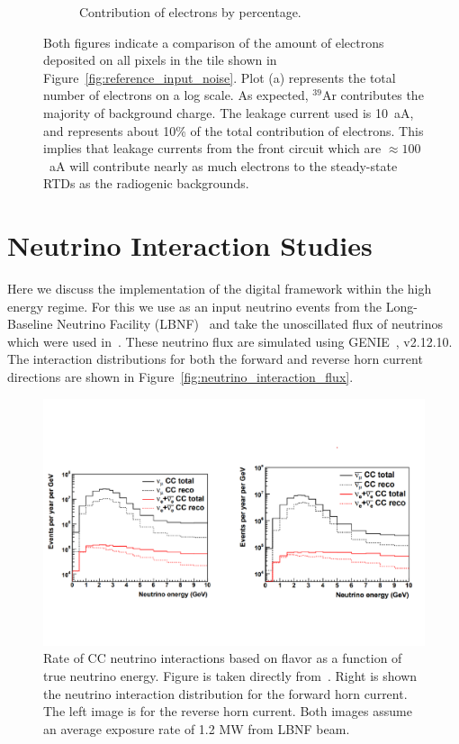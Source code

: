 \begin{figure}
\begin{subfigure}{.5\textwidth}
  \caption{Contribution of electrons by percentage.}
\end{subfigure}
\caption{Both figures indicate a comparison of the amount of electrons deposited on all pixels in the tile shown in Figure~\ref{fig:reference_input_noise}.
Plot (a) represents the total number of electrons on a log scale.
As expected, $^{39}$Ar contributes the majority of background charge.
The leakage current used is 10~\unit{aA}, and represents about 10\% of the total contribution of electrons.
This implies that leakage currents from the front circuit which are $\approx 100$~\unit{aA} will contribute nearly as much electrons to the steady-state RTDs as the radiogenic backgrounds.
}
\label{fig:compare_electron_contribution}
\end{figure}

\section{Neutrino Interaction Studies}
\label{sec:neutrino_studies}
Here we discuss the implementation of the digital framework within the high energy regime.
For this we use as an input neutrino events from the Long-Baseline Neutrino Facility (LBNF)~\citep{dune_cdr_2016_arxiv} and take the unoscillated flux of neutrinos which were used in~\citep{dune_2021_near_detector_cdr}.
These neutrino flux are simulated using GENIE~\citep{Andreopoulos:2009rq}, v2.12.10.
The interaction distributions for both the forward and reverse horn current directions are shown in Figure~\ref{fig:neutrino_interaction_flux}.

\begin{figure}[]
\centering
\includegraphics[width=\textwidth]{images/dune_cdr_2021_neutrino_flux.pdf}
\caption{Rate of CC neutrino interactions based on flavor as a function of true neutrino energy.
Figure is taken directly from~\citep{dune_2021_near_detector_cdr}.
Right is shown the neutrino interaction distribution for the forward horn current.
The left image is for the reverse horn current.
Both images assume an average exposure rate of 1.2 MW from LBNF beam.}
\end{figure}~\label{fig:neutrino_interaction_flux}

